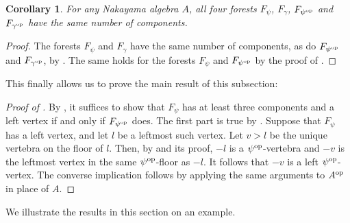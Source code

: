\documentclass[a4paper]{amsart}
\newtheorem{corollary}[theorem]{Corollary}
\theoremstyle{definition}
\theoremstyle{remark}
\numberwithin{equation}{theorem}
\newcommand{\psiforest}{F_\psi}
\newcommand{\gammaforest}{F_\gamma}
\newcommand{\op}{\textnormal{op}}
\newcommand{\psiop}{\psi^{\op}}
\newcommand{\gammaop}{\gamma^{\op}}
\newcommand{\psiopforest}{F_{\psiop}}
\newcommand{\gammaopforest}{F_{\gammaop}}
\begin{document}
\begin{corollary}
    \label{lemma:components}
    For any Nakayama algebra $A$, all four forests $\psiforest$, $\gammaforest$, $\psiopforest$ and $\gammaopforest$ have the same number of components.
\end{corollary}
\begin{proof}
    The forests $ \psiforest $ and $ \gammaforest $ have the same number of components, as do $ \psiopforest $ and $ \gammaopforest $, by .
    The same holds for the forests $ \psiforest $ and $ \psiopforest $ by the proof of .
\end{proof}

This finally allows us to prove the main result of this subsection:

\begin{proof}[Proof of ]
    By , it suffices to show that $\psiforest$ has at least three components and a left vertex if and only if $\psiopforest$ does.
    The first part is true by .
    Suppose that $\psiforest$ has a left vertex, and let $ l $ be a leftmost such vertex.
    Let $ v > l $ be the unique vertebra on the floor of $ l $.
    Then, by  and its proof, $-l$ is a $ \psi^\op $-vertebra and $-v$ is the leftmost vertex in the same $ \psi^\op $-floor as $-l$.
    It follows that $ -v $ is a left $ \psi^\op $-vertex. The converse implication follows by applying the same arguments to $A^\op$ in place of $A$.
\end{proof}

We illustrate the results in this section on an example.
\end{document}
